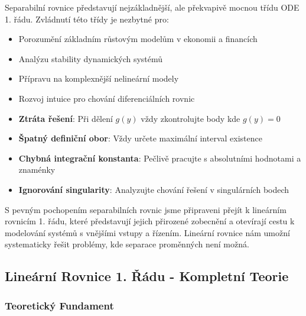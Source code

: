 Separabilní rovnice představují nejzákladnější, ale překvapivě mocnou třídu ODE 1. řádu. Zvládnutí této třídy je nezbytné pro:

\begin{itemize}
\item Porozumění základním růstovým modelům v ekonomii a financích
\item Analýzu stability dynamických systémů
\item Přípravu na komplexnější nelineární modely
\item Rozvoj intuice pro chování diferenciálních rovnic
\end{itemize}

\vspace{0.6\baselineskip}

\begin{remark}
\begin{itemize}
\item \textbf{Ztráta řešení}: Při dělení $g(y)$ vždy zkontrolujte body kde $g(y) = 0$
\item \textbf{Špatný definiční obor}: Vždy určete maximální interval existence
\item \textbf{Chybná integrační konstanta}: Pečlivě pracujte s absolutními hodnotami a znaménky
\item \textbf{Ignorování singularity}: Analyzujte chování řešení v singulárních bodech
\end{itemize}
\end{remark}

\vspace{0.8\baselineskip}

\begin{transition}
S pevným pochopením separabilních rovnic jsme připraveni přejít k lineárním rovnicím 1. řádu, které představují jejich přirozené zobecnění a otevírají cestu k modelování systémů s vnějšími vstupy a řízením. Lineární rovnice nám umožní systematicky řešit problémy, kde separace proměnných není možná.
\end{transition}

\subsection{Lineární Rovnice 1. Řádu - Kompletní Teorie}
\label{subsec:linearni-rovnice}

\subsubsection{Teoretický Fundament}
\label{subsubsec:teoreticky-fundament-linearni}

